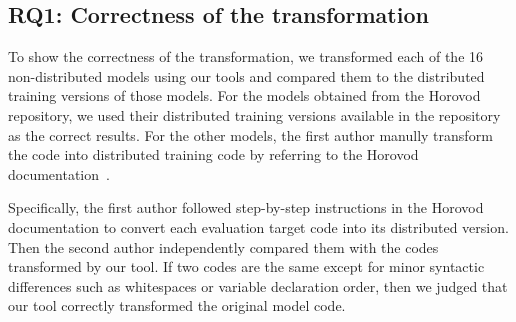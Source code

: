 \subsection{RQ1: Correctness of the transformation}
To show the correctness of the transformation, we transformed each of the 16
non-distributed models using our tools and compared them to the distributed training
versions of those models.
For the models obtained from the Horovod repository, we used their distributed
training versions available in the repository as the correct results.
For the other models, the first author manully transform the code into
distributed training code by referring to the Horovod documentation~\cite{hvd-docs}.
\begin{inred}
Specifically, the first author followed step-by-step instructions in the Horovod documentation
to convert each evaluation target code into its distributed version.
Then the second author independently compared them with the codes transformed
by our tool. 
If two codes are the same except for minor syntactic differences such as
whitespaces or variable declaration order,
then we judged that our tool correctly transformed the original model code.

\end{inred}




